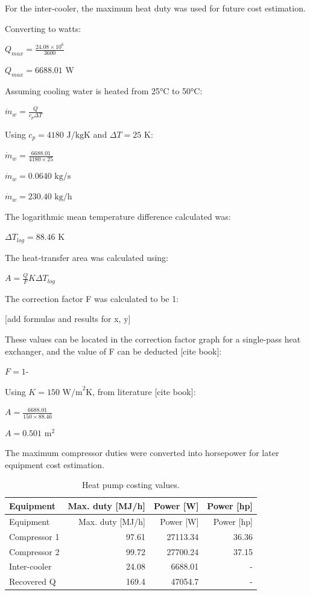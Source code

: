 For the inter-cooler, the maximum heat duty was used for future cost
estimation.

Converting to watts:

\(Q_{max} = \frac{24.08 \times 10^6}{3600}\)

\(Q_{max} = 6688.01 \text{ W}\)

Assuming cooling water is heated from 25°C to 50°C:

\(\dot{m}_{w} = \frac{Q}{c_p \Delta T}\)

Using \(c_p = 4180 \text{ J/kgK}\) and \(\Delta T = 25 \text{ K}\):

\(\dot{m}_{w} = \frac{6688.01}{4180 \times 25}\)

\(\dot{m}_{w} = 0.0640 \text{ kg/s}\)

\(\dot{m}_{w} = 230.40 \text{ kg/h}\)

The logarithmic mean temperature difference calculated was:

\(\Delta T_{log} = 88.46 \text{ K}\)

The heat-transfer area was calculated using:

\(A = \frac{Q}{F}{K \Delta T_{log}}\)

The correction factor F was calculated to be 1:

{[}add formulas and results for x, y{]}

These values can be located in the correction factor graph for a
single-pass heat exchanger, and the value of F can be deducted {[}cite
book{]}:

\(F = 1 \text{-}\)

Using \(K = 150 \text{ W/m}^2\text{K}\), from literature {[}cite
book{]}:

\(A = \frac{6688.01}{150 \times 88.46}\)

\(A = 0.501 \text{ m}^2\)

The maximum compressor duties were converted into horsepower for later
equipment cost estimation.

\begin{longtable}[]{@{}lrrr@{}}
\caption{Heat pump costing values.
\label{tab:Heat pump costing values}}\tabularnewline
\toprule\noalign{}
Equipment & Max. duty {[}MJ/h{]} & Power {[}W{]} & Power {[}hp{]} \\
\midrule\noalign{}
\endfirsthead
\toprule\noalign{}
Equipment & Max. duty {[}MJ/h{]} & Power {[}W{]} & Power {[}hp{]} \\
\midrule\noalign{}
\endhead
\bottomrule\noalign{}
\endlastfoot
Compressor 1 & 97.61 & 27113.34 & 36.36 \\
Compressor 2 & 99.72 & 27700.24 & 37.15 \\
Inter-cooler & 24.08 & 6688.01 & - \\
Recovered Q & 169.4 & 47054.7 & - \\
\end{longtable}

